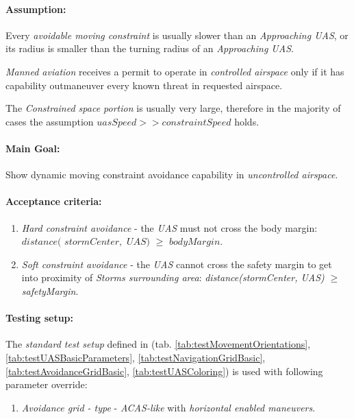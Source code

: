     \paragraph{Assumption:} Every \emph{avoidable moving constraint} is usually slower than an \emph{Approaching UAS}, or its radius is smaller than the turning radius of an \emph{Approaching UAS}.
    
    \begin{note}
    \emph{Manned aviation} receives a permit to operate in  \emph{controlled airspace} only if it has capability outmaneuver every known threat in requested airspace. 
    
    The \emph{Constrained space portion} is usually very large, therefore in the majority of cases the assumption $uasSpeed >> constraintSpeed$  holds.
    \end{note}
 
    \paragraph{Main Goal:} Show dynamic moving constraint avoidance capability in \emph{uncontrolled airspace}.
    
    \paragraph{Acceptance criteria:}
    \begin{enumerate}
        \item \emph{Hard constraint avoidance} - the \emph{UAS} must not cross the body margin:  $distance($ $stormCenter,$ $UAS)$ $\ge$  $bodyMargin$.
        
        \item \emph{Soft constraint avoidance} - the \emph{UAS} cannot cross the safety margin to get into proximity of \emph{Storms surrounding area}: \emph{distance(stormCenter, UAS)} $\ge$ \emph{safetyMargin}. 
    \end{enumerate}
    
    \paragraph{Testing setup:} The \emph{standard test setup} defined in (tab. \ref{tab:testMovementOrientations}, \ref{tab:testUASBasicParameters}, \ref{tab:testNavigationGridBasic}, \ref{tab:testAvoidanceGridBasic}, \ref{tab:testUASColoring}) is used with following parameter override:
    \begin{enumerate}
        \item \emph{Avoidance grid - type} - \emph{ACAS-like} with \emph{horizontal enabled maneuvers}.
    \end{enumerate}
    
